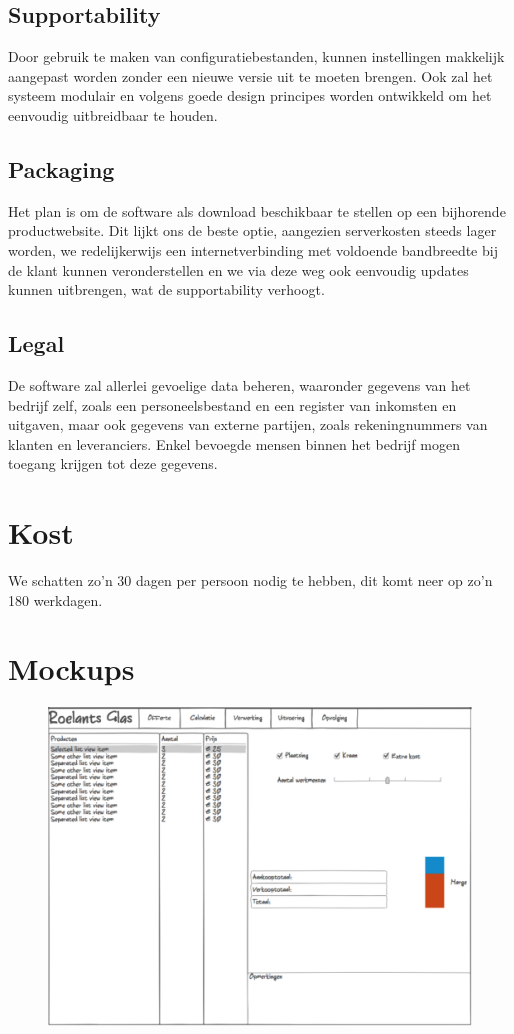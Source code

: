 \documentclass[a4paper]{article}
\begin{document}
\subsection{Supportability}
Door gebruik te maken van configuratiebestanden, kunnen instellingen makkelijk aangepast worden zonder een nieuwe versie uit te moeten brengen. Ook zal het systeem modulair en volgens goede design principes worden ontwikkeld om het eenvoudig uitbreidbaar te houden.

\subsection{Packaging}
Het plan is om de software als download beschikbaar te stellen op een bijhorende productwebsite. Dit lijkt ons de beste optie, aangezien serverkosten steeds lager worden, we redelijkerwijs een internetverbinding met voldoende bandbreedte bij de klant kunnen veronderstellen en we via deze weg ook eenvoudig updates kunnen uitbrengen, wat de supportability verhoogt.

\subsection{Legal}
De software zal allerlei gevoelige data beheren, waaronder gegevens van het bedrijf zelf, zoals een personeelsbestand en een register van inkomsten en uitgaven, maar ook gegevens van externe partijen, zoals rekeningnummers van klanten en leveranciers. Enkel bevoegde mensen binnen het bedrijf mogen toegang krijgen tot deze gegevens.

\section{Kost}
We schatten zo'n 30 dagen per persoon nodig te hebben, dit komt neer op zo'n 180 werkdagen.

\section{Mockups}
\begin{figure}[H]
  \includegraphics[width=\textwidth]{Mockup.png}
\end{figure}
\end{document}

